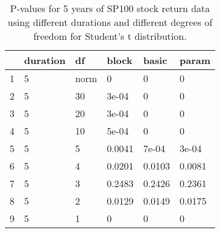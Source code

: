 \begin{table}[ht]
\centering
\caption{P-values for 5 years of SP100 stock return 
                   data using different durations
  and different degrees of freedom for Student's t distribution.} 
\label{table:SP1005}
\begin{tabular}{rlllll}
  \hline
 & duration & df & block & basic & param \\ 
  \hline
1 & 5 & norm & 0 & 0 & 0 \\ 
  2 & 5 & 30 & 3e-04 & 0 & 0 \\ 
  3 & 5 & 20 & 3e-04 & 0 & 0 \\ 
  4 & 5 & 10 & 5e-04 & 0 & 0 \\ 
  5 & 5 & 5 & 0.0041 & 7e-04 & 3e-04 \\ 
  6 & 5 & 4 & 0.0201 & 0.0103 & 0.0081 \\ 
  7 & 5 & 3 & 0.2483 & 0.2426 & 0.2361 \\ 
  8 & 5 & 2 & 0.0129 & 0.0149 & 0.0175 \\ 
  9 & 5 & 1 & 0 & 0 & 0 \\ 
   \hline
\end{tabular}
\end{table}

